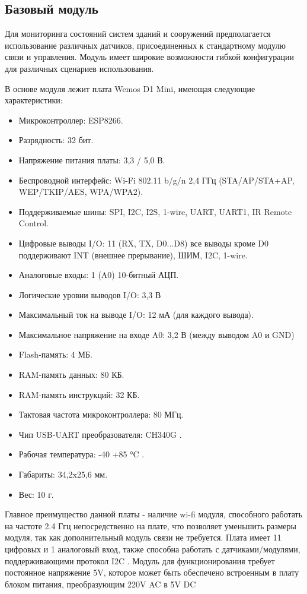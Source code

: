 \subsection{Базовый модуль}
Для мониторинга состояний систем зданий и сооружений предполагается использование различных датчиков, присоединенных к стандартному модулю связи и управления.
Модуль имеет широкие возможности гибкой конфигурации для различных сценариев использования.

В основе модуля лежит плата Wemos D1 Mini, имеющая следующие характеристики:
\begin{itemize}
    \item Микроконтроллер: ESP8266.
    \item Разрядность: 32 бит.
    \item Напряжение питания платы: 3,3 / 5,0 В.
    \item Беспроводной интерфейс: Wi-Fi 802.11 b/g/n 2,4 ГГц (STA/AP/STA+AP, WEP/TKIP/AES, WPA/WPA2).
    \item Поддерживаемые шины: SPI, I2C, I2S, 1-wire, UART, UART1, IR Remote Control.
    \item Цифровые выводы I/O: 11 (RX, TX, D0...D8) все выводы кроме D0 поддерживают INT (внешнее прерывание), ШИМ, I2C, 1-wire.
    \item Аналоговые входы: 1 (A0) 10-битный АЦП.
    \item Логические уровни выводов I/O: 3,3 В
    \item Максимальный ток на выводе I/O: 12 мА (для каждого вывода).
    \item Максимальное напряжение на входе A0: 3,2 В (между выводом A0 и GND)
    \item Flash-память: 4 МБ.
    \item RAM-память данных: 80 КБ.
    \item RAM-память инструкций: 32 КБ.
    \item Тактовая частота микроконтроллера: 80 МГц.
    \item Чип USB-UART преобразователя: CH340G .
    \item Рабочая температура: -40 +85 °C .
    \item Габариты: 34,2x25,6 мм.
    \item Вес: 10 г.
\end{itemize}
Главное преимущество данной платы - наличие wi-fi модуля, способного работать на частоте 2.4 Ггц непосредственно на плате, что позволяет уменьшить размеры модуля, так как дополнительный модуль связи не требуется.
Плата имеет 11 цифровых и 1 аналоговый вход, также способна работать с датчиками/модулями, поддерживающими протокол I2C .
Модуль для функционирования требует постоянное напряжение 5V, которое может быть обеспечено встроенным в плату блоком питания, преобразующим 220V AC в 5V DC

